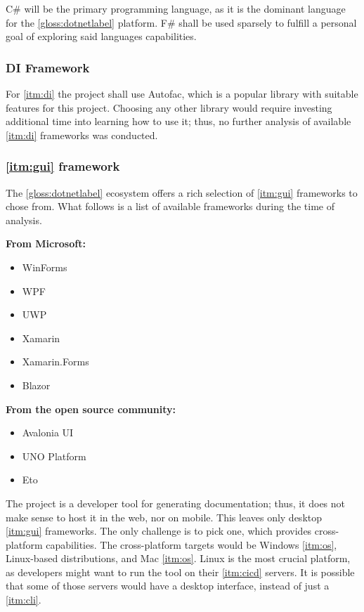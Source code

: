 C\# will be the primary programming language, as it is the dominant language for the \ref{gloss:dotnetlabel} platform.
F\# shall be used sparsely to fulfill a personal goal of exploring said languages capabilities.

\subsubsection{DI Framework}

For \ref{itm:di} the project shall use Autofac, which is a popular library with suitable features for this project. Choosing any other library would require investing additional time into learning how to use it; thus, no further analysis of available \ref{itm:di} frameworks was conducted.

\subsubsection{\ref{itm:gui} framework} \label{sec:guiFramework}

The \ref{gloss:dotnetlabel} ecosystem offers a rich selection of \ref{itm:gui} frameworks to chose from. What follows is a list of available frameworks during the time of analysis.

\textbf{From Microsoft:}
\begin{itemize}
    \item WinForms
    \item WPF
    \item UWP
    \item Xamarin
    \item Xamarin.Forms
    \item Blazor
\end{itemize}

\textbf{From the open source community:}
\begin{itemize}
    \item Avalonia UI
    \item UNO Platform
    \item Eto
\end{itemize}

The project is a developer tool for generating documentation; thus, it does not make sense to host it in the web, nor on mobile. This leaves only desktop \ref{itm:gui} frameworks. The only challenge is to pick one, which provides cross-platform capabilities. The cross-platform targets would be Windows \ref{itm:os}, Linux-based distributions, and Mac \ref{itm:os}.
Linux is the most crucial platform, as developers might want to run the tool on their \ref{itm:cicd} servers. It is possible that some of those servers would have a desktop interface, instead of just a \ref{itm:cli}.

